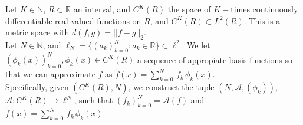 \documentclass[amsmath,amssymb,floatfix]{revtex4}
\begin{document}
\begin{flushleft}
Let $K \in \mathbb{N}$, $R \subset \mathbb{R}$ an interval, and $C^K(R)$ the space of $K-$times continuously differentiable real-valued functions on $R$, and $C^K(R) \subset L^2(R)$. This is a metric space with $d(f,g) = ||f-g||_2$. \\
Let $N \in \mathbb{N}$, and $\ell_N = \{ (a_k)_{k=0}^N: a_k \in \mathbb{R} \} \subset \ell^2$. We let $(\phi_k(x))_{k=0}^N, \phi_k(x) \in C^K(R) $ a sequence of appropiate basis functions so that we can approximate $f$ as $\tilde{f}(x) = \sum_{k=0}^N \, f_k \, \phi_k(x)$. \\
Specifically, given $(C^K(R), N)$, we construct the tuple $(N, \mathcal{A}, (\phi_k))$, $\mathcal{A}: C^K(R) \rightarrow \ell^N$, such that $(f_k)_{k=0}^N = \mathcal{A}(f)$ and $\tilde{f}(x) = \sum_{k=0}^N \, f_k \, \phi_k(x)$.
\end{flushleft}
\end{document}

